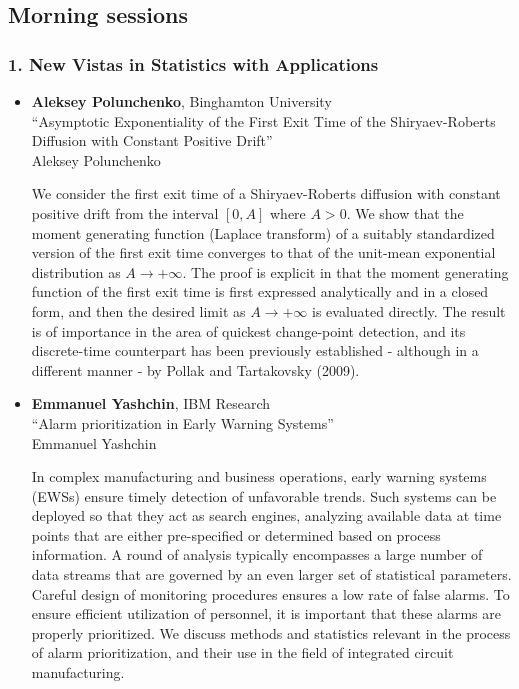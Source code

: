 
\subsection*{Morning sessions}

\subsubsection*{1. New Vistas in Statistics with Applications}

\begin{itemize}
\item \textbf{Aleksey Polunchenko}, Binghamton University \\
``Asymptotic Exponentiality of the First Exit Time of the Shiryaev-Roberts Diffusion with Constant Positive Drift'' \\
Aleksey Polunchenko


We consider the first exit time of a Shiryaev-Roberts diffusion with constant positive drift from the interval $[0,A]$ where $A>0$. We show that the moment generating function (Laplace transform) of a suitably standardized version of the first exit time converges to that of the unit-mean exponential distribution as $A\to+\infty$. The proof is explicit in that the moment generating function of the first exit time is first expressed analytically and in a closed form, and then the desired limit as $A\to+\infty$ is evaluated directly. The result is of importance in the area of quickest change-point detection, and its discrete-time counterpart has been previously established - although in a different manner - by Pollak and Tartakovsky (2009).

\item \textbf{Emmanuel Yashchin}, IBM Research \\
``Alarm prioritization in Early Warning Systems'' \\
Emmanuel Yashchin


In complex manufacturing and business operations, early warning systems (EWSs) ensure timely detection of unfavorable trends. Such systems can be deployed so that they act as search engines, analyzing available data at time points that are either pre-specified or determined based on process information. A round of analysis typically encompasses a large number of data streams that are governed by an even larger set of statistical parameters. Careful design of monitoring procedures ensures a low rate of false alarms. To ensure efficient utilization of personnel, it is important that these alarms are properly prioritized. We discuss methods and statistics relevant in the process of alarm prioritization, and their use in the field of integrated circuit manufacturing. 


\end{itemize}
